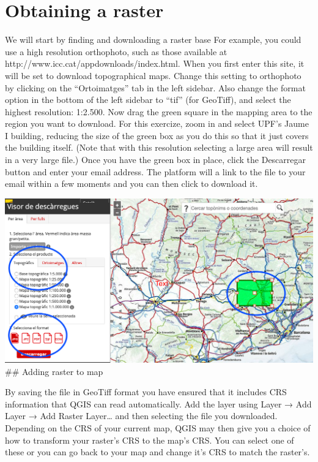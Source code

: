 \documentclass[]{book}
\begin{document}
\hypertarget{obtaining-a-raster}{%
\section{Obtaining a raster}\label{obtaining-a-raster}}

We will start by finding and downloading a raster base For example, you could use a high resolution orthophoto, such as those available at http://www.icc.cat/appdownloads/index.html. When you first enter this site, it will be set to download topographical maps. Change this setting to orthophoto by clicking on the ``Ortoimatges'' tab in the left sidebar. Also change the format option in the bottom of the left sidebar to ``tif'' (for GeoTiff), and select the highest resolution: 1:2.500. Now drag the green square in the mapping area to the region you want to download. For this exercize, zoom in and select UPF's Jaume I building, reducing the size of the green box as you do this so that it just covers the building itself. (Note that with this resolution selecting a large area will result in a very large file.) Once you have the green box in place, click the Descarregar button and enter your email address. The platform will a link to the file to your email within a few moments and you can then click to download it.

\includegraphics{images/icc_map.png}
\#\# Adding raster to map

By saving the file in GeoTiff format you have ensured that it includes CRS information that QGIS can read automatically. Add the layer using Layer → Add Layer → Add Raster Layer\ldots{} and then selecting the file you downloaded. Depending on the CRS of your current map, QGIS may then give you a choice of how to transform your raster's CRS to the map's CRS. You can select one of these or you can go back to your map and change it's CRS to match the raster's.
\end{document}

